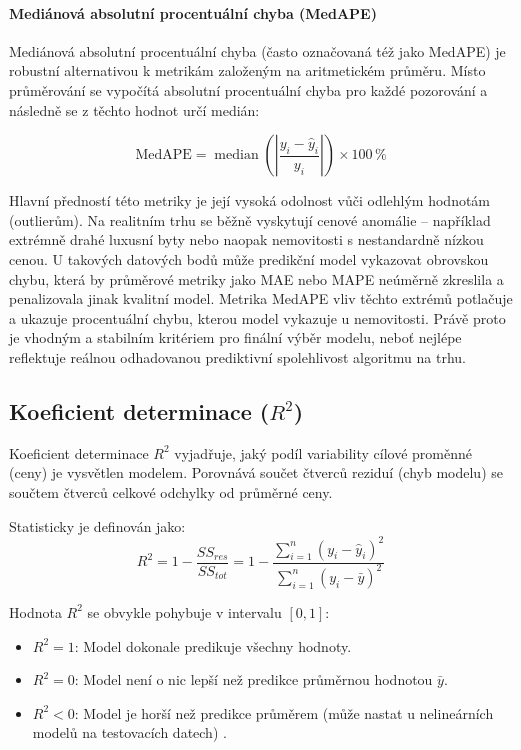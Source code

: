 \paragraph{Mediánová absolutní procentuální chyba (MedAPE)}
Mediánová absolutní procentuální chyba (často označovaná též jako MedAPE) je robustní alternativou k metrikám založeným na aritmetickém průměru. Místo průměrování se vypočítá absolutní procentuální chyba pro každé pozorování a následně se z těchto hodnot určí medián:

$$\mathrm{MedAPE} = \operatorname{median} \left( \left| \frac{y_i - \hat{y}_i}{y_i} \right| \right) \times 100\,\%$$

Hlavní předností této metriky je její vysoká odolnost vůči odlehlým hodnotám (outlierům). Na realitním trhu se běžně vyskytují cenové anomálie – například extrémně drahé luxusní byty nebo naopak nemovitosti s nestandardně nízkou cenou. U takových datových bodů může predikční model vykazovat obrovskou chybu, která by průměrové metriky jako MAE nebo MAPE neúměrně zkreslila a penalizovala jinak kvalitní model. Metrika MedAPE vliv těchto extrémů potlačuje a ukazuje procentuální chybu, kterou model vykazuje u  nemovitosti. Právě proto je vhodným a stabilním kritériem pro finální výběr modelu, neboť nejlépe reflektuje reálnou odhadovanou prediktivní spolehlivost algoritmu na trhu.

\subsection*{Koeficient determinace (\texorpdfstring{$R^2$}{R\^2})}
\label{subsec:r2_theory}

Koeficient determinace $R^2$ vyjadřuje, jaký podíl variability cílové proměnné (ceny) je vysvětlen modelem. Porovnává součet čtverců reziduí (chyb modelu) se součtem čtverců celkové odchylky od průměrné ceny.



Statisticky je definován jako:
\begin{equation}
    R^2 = 1 - \frac{SS_{res}}{SS_{tot}} = 1 - \frac{\sum_{i=1}^{n} (y_i - \hat{y}_i)^2}{\sum_{i=1}^{n} (y_i - \bar{y})^2}
\end{equation}

Hodnota $R^2$ se obvykle pohybuje v intervalu $[0, 1]$:
\begin{itemize}
    \item $R^2 = 1$: Model dokonale predikuje všechny hodnoty.
    \item $R^2 = 0$: Model není o nic lepší než predikce průměrnou hodnotou $\bar{y}$.
    \item $R^2 < 0$: Model je horší než predikce průměrem (může nastat u nelineárních modelů na testovacích datech) \cite{Kvalseth1985R2}.
\end{itemize}

